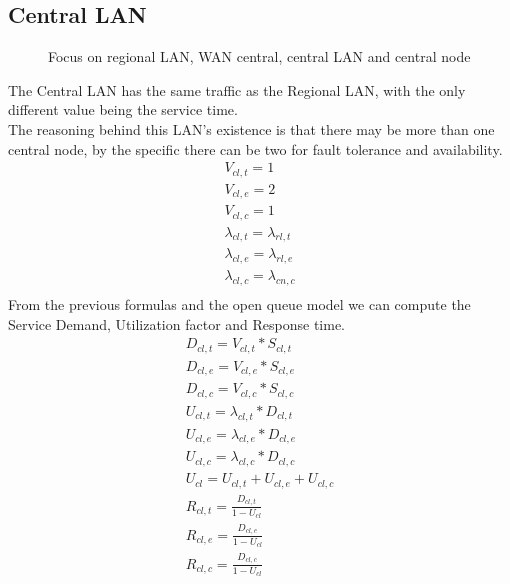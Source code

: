 \documentclass[11pt]{article}
\begin{document}
\subsection{Central LAN}
\begin{figure}[H]
	\hspace*{-3.75cm}
	\centering
	\frame{}
	\caption{Focus on regional LAN, WAN central, central LAN and central node}
\end{figure}
The Central LAN has the same traffic as the Regional LAN, with the only different value being the service time.\\
The reasoning behind this LAN's existence is that there may be more than one central node, by the specific there can be two for fault tolerance and availability.
\begin{equation}
	\begin{array}{l}
		V_{cl, t} = 1 \\
		V_{cl, e} = 2 \\ %
		V_{cl,c} = 1 \\
		\lambda_{cl, t} = \lambda_{rl,t} \\
		\lambda_{cl, e} = \lambda_{rl,e} \\
		\lambda_{cl, c} = \lambda_{cn, c} \\
	\end{array}
\end{equation}
From the previous formulas and the open queue model we can compute the Service Demand, Utilization factor and Response time.
\begin{equation}
	\begin{array}{l}
		D_{cl, t} = V_{cl, t} * S_{cl, t} \\
		D_{cl, e} = V_{cl, e} * S_{cl, e} \\
		D_{cl, c} = V_{cl, c} * S_{cl, c} \\
		U_{cl, t} = \lambda_{cl, t} * D_{cl, t} \\
		U_{cl, e} = \lambda_{cl, e} * D_{cl, e} \\
		U_{cl, c} = \lambda_{cl, c} * D_{cl, c} \\
		U_{cl} = U_{cl, t} + U_{cl, e} + U_{cl, c} \\
		R_{cl, t} = \frac{D_{cl, t}}{1 - U_{cl}} \\
		R_{cl, e} = \frac{D_{cl, e}}{1 - U_{cl}} \\
		R_{cl, c} = \frac{D_{cl, c}}{1 - U_{cl}} \\
	\end{array}
\end{equation}
\end{document}

